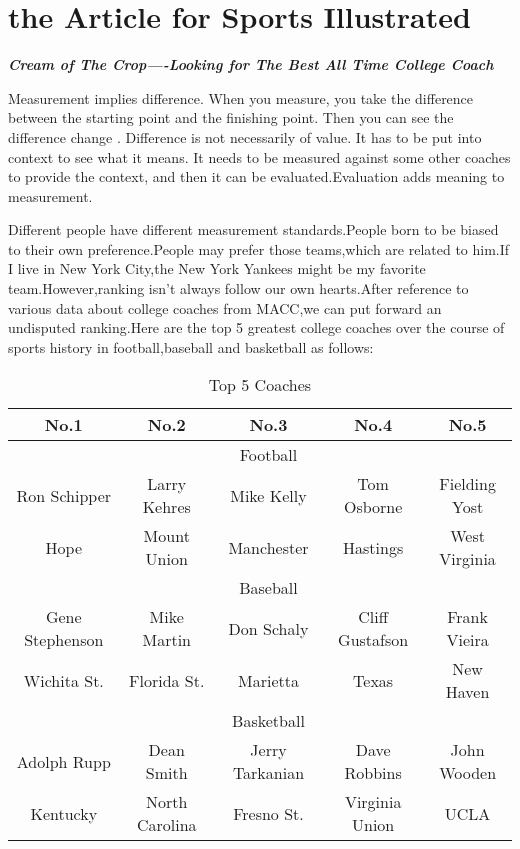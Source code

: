 \documentclass{mcmthesis}
\begin{document}
\section{the Article for Sports Illustrated}
\begin{center}
\textbf{\Large{\emph{Cream of The Crop----Looking for The Best All Time College Coach}}}
\end{center}
\par Measurement implies difference. When you measure, you take the difference between the starting point and the finishing point. Then you can see the difference change . Difference is not necessarily of value. It has to be put into context to see what it means. It needs to be measured against some other coaches to provide the context, and then it can be evaluated.Evaluation adds meaning to measurement.
\par Different people have different measurement standards.People born to be biased to their own preference.People may prefer those teams,which are related to him.If I live in New York City,the New York Yankees might
be my favorite team.However,ranking isn't always follow our own hearts.After reference to various data about college coaches from MACC,we can put forward an undisputed ranking.Here are the top 5 greatest college coaches over the course of sports history in football,baseball and basketball as follows:
\begin{table}[h]
\centering
 \caption{\label{tab:test}Top 5 Coaches}
 \begin{tabular}{ccccc}
  \toprule
 No.1 & No.2 & No.3 & No.4 & No.5 \\
  \midrule
 &&Football&&\\
 \hline
Ron Schipper  & Larry Kehres & Mike Kelly &Tom Osborne&Fielding Yost \\
Hope &Mount Union &Manchester&Hastings&West Virginia\\
\hline
&&Baseball&&\\
\hline
Gene Stephenson  & Mike Martin & Don Schaly &Cliff Gustafson&Frank Vieira \\
Wichita St. &Florida St.  &Marietta &Texas&New Haven \\
\hline
&&Basketball&&\\
\hline
Adolph Rupp  & Dean Smith & Jerry Tarkanian &Dave Robbins&John Wooden \\
Kentucky &North Carolina &Fresno St. &Virginia Union&UCLA\\
  \bottomrule
 \end{tabular}
\end{table}
\end{document}

